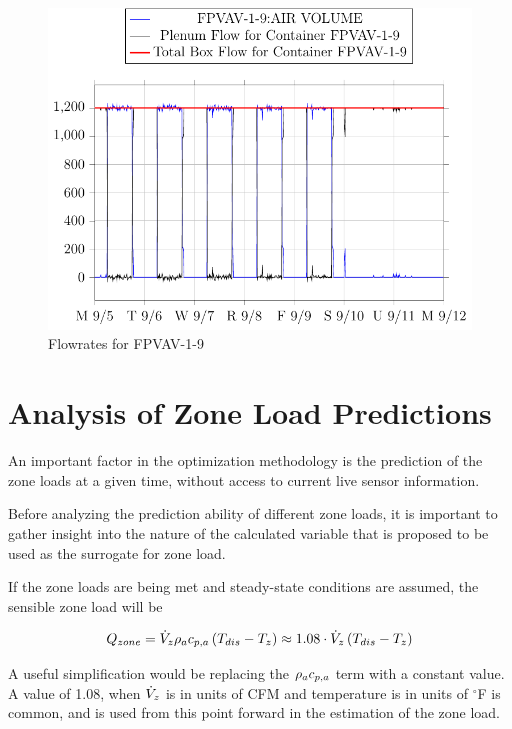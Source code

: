 \begin{figure}
\centering
\includegraphics[]{Plots/2016-09-16-1639-FPVAV19AIRVOLUME-TikzData.pdf}
\caption{Flowrates for FPVAV-1-9}
\label{fig:2016-09-16-1639-FPVAV19AIRVOLUME-TikzData}
\end{figure}




\section{Analysis of Zone Load Predictions}

An important factor in the optimization methodology is the prediction of the zone loads at a given time, without access to current live sensor information. 

Before analyzing the prediction ability of different zone loads, it is important to gather insight into the nature of the calculated variable that is proposed to be used as the surrogate for zone load.   

If the zone loads are being met and steady-state conditions are assumed, the sensible zone load will be

\begin{equation}
    Q_{zone}=\dot{V}_{z} \rho_a c_{p,a}{} \left(T_{dis}-T_{z} \right) \approx 1.08 \cdot \dot{V}_{z}\left(T_{dis}-T_{z} \right)
\end{equation}

A useful simplification would be replacing the \(\rho_a c_{p,a}{}\) term with a constant value. A value of 1.08, when \(\dot{V}_{z}\) is in units of CFM and temperature is in units of \(^\circ\)F is common, and is used from this point forward in the estimation of the zone load.

